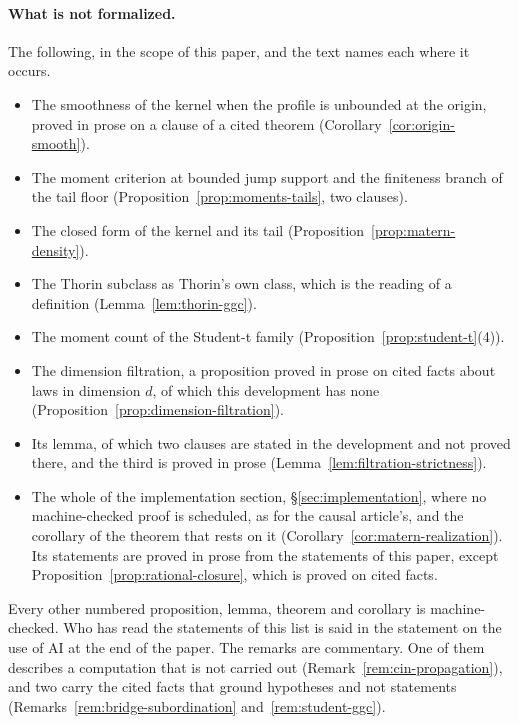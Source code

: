 \paragraph{What is not formalized.} The following, in the scope of this paper, and the text
names each where it occurs.
\begin{itemize}
\item The smoothness of the kernel when the profile is unbounded at the origin, proved in
prose on a clause of a cited theorem (Corollary~\ref{cor:origin-smooth}).
\item The moment criterion at bounded jump support and the finiteness branch of the tail
floor (Proposition~\ref{prop:moments-tails}, two clauses).
\item The closed form of the \Matern{} kernel and its tail
(Proposition~\ref{prop:matern-density}).
\item The Thorin subclass as Thorin's own class, which is the reading of a definition
(Lemma~\ref{lem:thorin-ggc}).
\item The moment count of the Student-t family (Proposition~\ref{prop:student-t}(4)).
\item The dimension filtration, a proposition proved in prose on cited facts about laws in
dimension $d$, of which this development has none
(Proposition~\ref{prop:dimension-filtration}).
\item Its lemma, of which two clauses are stated in the development and not proved there, and
the third is proved in prose (Lemma~\ref{lem:filtration-strictness}).
\item The whole of the implementation section, \S\ref{sec:implementation}, where no
machine-checked proof is scheduled, as for the causal article's, and the corollary of the
\Matern{} theorem that rests on it (Corollary~\ref{cor:matern-realization}). Its statements are
proved in prose from the statements of this paper, except
Proposition~\ref{prop:rational-closure}, which is proved on cited facts.
\end{itemize}
Every other numbered proposition, lemma, theorem and corollary is machine-checked. Who has read
the statements of this list is said in the statement on the use of AI at the end of the paper.
The remarks are commentary. One of them describes a computation that is not
carried out (Remark~\ref{rem:cin-propagation}), and two carry the cited facts that ground
hypotheses and not statements (Remarks~\ref{rem:bridge-subordination}
and~\ref{rem:student-ggc}).

